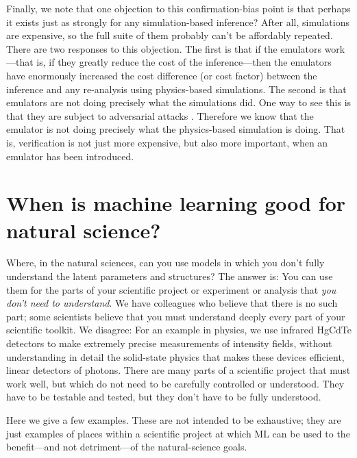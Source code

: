 \documentclass{article}
\begin{document}
Finally, we note that one objection to this confirmation-bias point is that perhaps it exists just as strongly for any simulation-based inference?
After all, simulations are expensive, so the full suite of them probably can't be affordably repeated.
There are two responses to this objection.
The first is that if the emulators work---that is, if they greatly reduce the cost of the inference---then the emulators have enormously increased the cost difference (or cost factor) between the inference and any re-analysis using physics-based simulations.
The second is that emulators are not doing precisely what the simulations did.
One way to see this is that they are subject to adversarial attacks \cite{melchior}.
Therefore we know that the emulator is not doing precisely what the physics-based simulation is doing.
That is, verification is not just more expensive, but also more important, when an emulator has been introduced.

\section{When is machine learning good for natural science?}\label{sec:good}
Where, in the natural sciences, can you use models in which you don't fully understand the latent parameters and structures?
The answer is: You can use them for the parts of your scientific project or experiment or analysis that \emph{you don't need to understand}.
We have colleagues who believe that there is no such part; some scientists believe that you must understand deeply every part of your scientific toolkit.
We disagree: For an example in physics, we use infrared HgCdTe detectors \cite{hgcdte} to make extremely precise measurements of intensity fields, without understanding in detail the solid-state physics that makes these devices efficient, linear detectors of photons.
There are many parts of a scientific project that must work well, but which do not need to be carefully controlled or understood.
They have to be testable and tested, but they don't have to be fully understood.

Here we give a few examples.
These are not intended to be exhaustive; they are just examples of places within a scientific project at which ML can be used to the benefit---and not detriment---of the natural-science goals.
\end{document}
